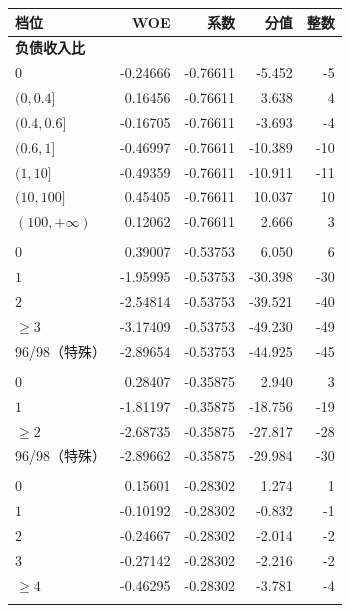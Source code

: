\hfill
\begin{minipage}[t]{0.49\linewidth}
\vspace{0pt}
\centering
\begin{tabular}{lrrrr}
\toprule
档位 & WOE & 系数 & 分值 & 整数 \\
\midrule
\multicolumn{5}{l}{\textbf{负债收入比}}\\
$0$ & -0.24666 & -0.76611 & -5.452 & -5 \\
$(0,0.4]$ & 0.16456 & -0.76611 & 3.638 & 4 \\
$(0.4,0.6]$ & -0.16705 & -0.76611 & -3.693 & -4 \\
$(0.6,1]$ & -0.46997 & -0.76611 & -10.389 & -10 \\
$(1,10]$ & -0.49359 & -0.76611 & -10.911 & -11 \\
$(10,100]$ & 0.45405 & -0.76611 & 10.037 & 10 \\
$(100,+\infty)$ & 0.12062 & -0.76611 & 2.666 & 3 \\
\addlinespace[1pt]
\multicolumn{5}{l}{\textbf{90 天及以上逾期次数}}\\
$0$ & 0.39007 & -0.53753 & 6.050 & 6 \\
$1$ & -1.95995 & -0.53753 & -30.398 & -30 \\
$2$ & -2.54814 & -0.53753 & -39.521 & -40 \\
$\geq 3$ & -3.17409 & -0.53753 & -49.230 & -49 \\
96/98（特殊） & -2.89654 & -0.53753 & -44.925 & -45 \\
\addlinespace[1pt]
\multicolumn{5}{l}{\textbf{60–89 天逾期次数}}\\
$0$ & 0.28407 & -0.35875 & 2.940 & 3 \\
$1$ & -1.81197 & -0.35875 & -18.756 & -19 \\
$\geq 2$ & -2.68735 & -0.35875 & -27.817 & -28 \\
96/98（特殊） & -2.89662 & -0.35875 & -29.984 & -30 \\
\addlinespace[1pt]
\multicolumn{5}{l}{\textbf{家属人数}}\\
$0$ & 0.15601 & -0.28302 & 1.274 & 1 \\
$1$ & -0.10192 & -0.28302 & -0.832 & -1 \\
$2$ & -0.24667 & -0.28302 & -2.014 & -2 \\
$3$ & -0.27142 & -0.28302 & -2.216 & -2 \\
$\geq 4$ & -0.46295 & -0.28302 & -3.781 & -4 \\
\addlinespace[1pt]
\bottomrule
\end{tabular}
\end{minipage}%
